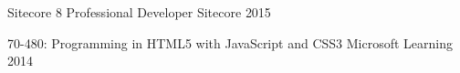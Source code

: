 

\begin{cvhonors}

  \cvhonor
    {Sitecore 8 Professional Developer} %
    {Sitecore} %
    {2015} %

  \cvhonor
    {70-480: Programming in HTML5 with JavaScript and CSS3} %
    {Microsoft Learning} %
    {2014} %

\end{cvhonors}
